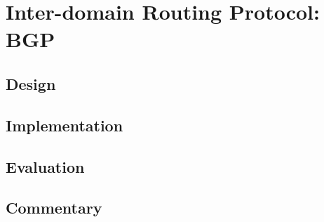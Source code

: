 \section{Inter-domain Routing Protocol: BGP}
\label{sec:bgp}

\subsection{Design}

\subsection{Implementation}

\subsection{Evaluation}

\subsection{Commentary}
